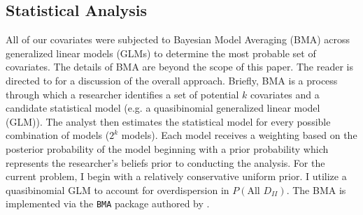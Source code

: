 \documentclass[1p, review]{elsarticle}\usepackage[]{graphicx}\usepackage[]{color}
\begin{document}
\begin{table}[ht]
\centering
{}
\caption{Descriptive Statistics} 
\label{tabdesc}
\end{table}



\subsection{Statistical Analysis}
All of our covariates were subjected to Bayesian Model Averaging (BMA) across generalized linear models (GLMs) to determine the most probable set of covariates. The details of BMA are beyond the scope of this paper. The reader is directed to \citet{Hoeting1999} for a discussion of the overall approach. Briefly, BMA is a process through which a researcher identifies a set of potential $k$ covariates and a candidate statistical model (e.g. a quasibinomial generalized linear model (GLM)). The analyst then estimates the statistical model for every possible combination of models ($2^k$ models). Each model receives a weighting based on the posterior probability of the model beginning with a prior probability which represents the researcher's beliefs prior to conducting the analysis. For the current problem, I begin with a relatively conservative uniform prior. I utilize a quasibinomial GLM to account for overdispersion in $P(\text{All }D_{II})$. The BMA is implemented via the \texttt{BMA} package authored by \citet{Raftery2009}. 
\end{document}
